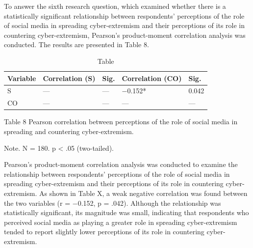\documentclass{NSP1}
\begin{document}
\par\medskip{}\smallskip

To answer the sixth research question, which examined whether there is a statistically significant relationship between respondents' perceptions of the role of social media in spreading cyber-extremism and their perceptions of its role in countering cyber-extremism, Pearson's product-moment correlation analysis was conducted. The results are presented in Table 8.

\begin{table}[tbp]
\centering
{\small
\begin{tabular}{|p{}|p{}|p{}|p{}|p{}|}
\hline
\cellcolor[HTML]{DDD9C3}\textbf{Variable} & \cellcolor[HTML]{DDD9C3}\textbf{Correlation (S)} & \cellcolor[HTML]{DDD9C3}\textbf{Sig.} & \cellcolor[HTML]{DDD9C3}\textbf{Correlation (CO)} & \cellcolor[HTML]{DDD9C3}\textbf{Sig.} \\
\hline
\cellcolor[HTML]{DDD9C3}S & — & — & −0.152* & 0.042 \\
\hline
\cellcolor[HTML]{DDD9C3}CO & — & — & — & — \\
\hline
\end{tabular}}
\caption{Table}

\end{table}

Table 8 Pearson correlation between perceptions of the role of social media in spreading and countering cyber-extremism.

Note. N = 180. p \textless{} .05 (two-tailed).

Pearson's product-moment correlation analysis was conducted to examine the relationship between respondents' perceptions of the role of social media in spreading cyber-extremism and their perceptions of its role in countering cyber-extremism. As shown in Table X, a weak negative correlation was found between the two variables (r = −0.152, p = .042). Although the relationship was statistically significant, its magnitude was small, indicating that respondents who perceived social media as playing a greater role in spreading cyber-extremism tended to report slightly lower perceptions of its role in countering cyber-extremism.
\end{document}
